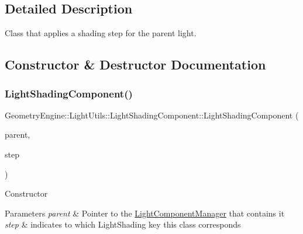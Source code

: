 \subsection{Detailed Description}
Class that applies a shading step for the parent light. 

\subsection{Constructor \& Destructor Documentation}
\mbox{\label{class_geometry_engine_1_1_light_utils_1_1_light_shading_component_a70c7751d6162e5fe224079eb1c4337da}} 
\subsubsection{\texorpdfstring{LightShadingComponent()}{LightShadingComponent()}\hspace{0.1cm}{\footnotesize\ttfamily [1/2]}}
{\footnotesize\ttfamily Geometry\+Engine\+::\+Light\+Utils\+::\+Light\+Shading\+Component\+::\+Light\+Shading\+Component (\begin{DoxyParamCaption}\item[{\mbox{\hyperlink{class_geometry_engine_1_1_light_utils_1_1_light_component_manager}{Light\+Component\+Manager}} $\ast$}]{parent,  }\item[{\mbox{\hyperlink{namespace_geometry_engine_1_1_light_utils_a16eb370137c2fd151e6f8e1d07cd23e0}{Light\+Shading}}}]{step }\end{DoxyParamCaption})}

Constructor 
\begin{DoxyParams}{Parameters}
{\em parent} & Pointer to the \mbox{\hyperlink{class_geometry_engine_1_1_light_utils_1_1_light_component_manager}{Light\+Component\+Manager}} that contains it \\
\hline
{\em step} & indicates to which Light\+Shading key this class corresponds \\
\hline
\end{DoxyParams}
\mbox{\label{class_geometry_engine_1_1_light_utils_1_1_light_shading_component_a7de2f38f87aca7cc7cca49a09009098b}} 
